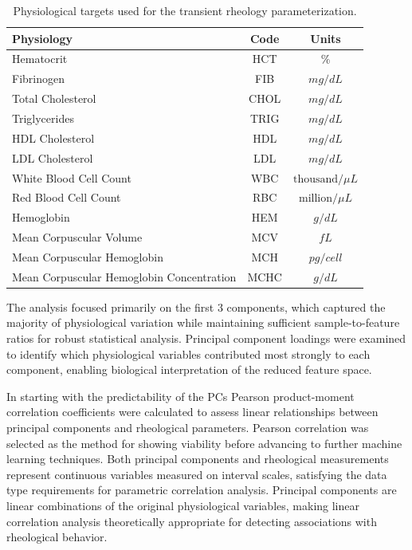 \documentclass[12pt,letterpaper]{article}
\begin{document}
\begin{table}[]
    \centering
    \caption{Physiological targets used for the transient rheology parameterization.}
    \begin{tabular}{lcc}
        Physiology                                & Code & Units \\
        \hline
        Hematocrit                                & HCT  & $\%$ \\
        Fibrinogen                                & FIB  & $mg/dL$ \\
        Total Cholesterol                         & CHOL & $mg/dL$ \\
        Triglycerides                             & TRIG & $mg/dL$ \\
        HDL Cholesterol                           & HDL  & $mg/dL$ \\
        LDL Cholesterol                           & LDL  & $mg/dL$ \\
        White Blood Cell Count                    & WBC  & $\text{thousand}/\mu L$ \\
        Red Blood Cell Count                      & RBC  & $\text{million}/\mu L$ \\
        Hemoglobin                                & HEM  & $g/dL$ \\
        Mean Corpuscular Volume                   & MCV  & $fL$ \\
        Mean Corpuscular Hemoglobin               & MCH  & $pg/cell$ \\
        Mean Corpuscular Hemoglobin Concentration & MCHC & $g/dL$
    \end{tabular}
    \label{need label}
\end{table}

The analysis focused primarily on the first 3 components, which captured the majority of physiological variation while maintaining sufficient sample-to-feature ratios for
robust statistical analysis. Principal component loadings were examined to identify which physiological variables contributed most strongly to each component, enabling biological
interpretation of the reduced feature space.

In starting with the predictability of the PCs Pearson product-moment correlation coefficients were calculated to assess linear relationships between principal components and
rheological parameters. Pearson correlation was selected as the method for showing viability before advancing to further machine learning techniques. Both principal components
and rheological measurements represent continuous variables measured on interval scales, satisfying the data type requirements for parametric correlation analysis.
Principal components are linear combinations of the original physiological variables, making linear correlation analysis theoretically appropriate for detecting associations
with rheological behavior.
\end{document}
